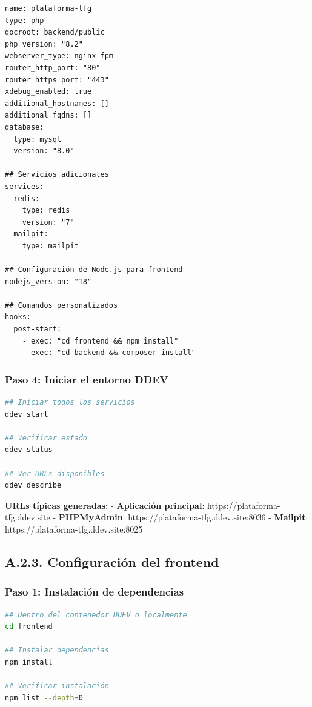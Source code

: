 \documentclass[12pt,a4paper,oneside]{report}
\begin{document}
{\begin{lstlisting}
name: plataforma-tfg
type: php
docroot: backend/public
php_version: "8.2"
webserver_type: nginx-fpm
router_http_port: "80"
router_https_port: "443"
xdebug_enabled: true
additional_hostnames: []
additional_fqdns: []
database:
  type: mysql
  version: "8.0"
  
## Servicios adicionales
services:
  redis:
    type: redis
    version: "7"
  mailpit:
    type: mailpit

## Configuración de Node.js para frontend
nodejs_version: "18"

## Comandos personalizados
hooks:
  post-start:
    - exec: "cd frontend && npm install"
    - exec: "cd backend && composer install"
\end{lstlisting}

\subsubsection{Paso 4: Iniciar el entorno
DDEV}\label{paso-4-iniciar-el-entorno-ddev}

\begin{lstlisting}[language=bash]
## Iniciar todos los servicios
ddev start

## Verificar estado
ddev status

## Ver URLs disponibles
ddev describe
\end{lstlisting}

\textbf{URLs típicas generadas:} - \textbf{Aplicación principal}:
https://plataforma-tfg.ddev.site - \textbf{PHPMyAdmin}:
https://plataforma-tfg.ddev.site:8036 - \textbf{Mailpit}:
https://plataforma-tfg.ddev.site:8025

\subsection{A.2.3. Configuración del
frontend}\label{a.2.3.-configuraciuxf3n-del-frontend}

\subsubsection{Paso 1: Instalación de
dependencias}\label{paso-1-instalaciuxf3n-de-dependencias}

\begin{lstlisting}[language=bash]
## Dentro del contenedor DDEV o localmente
cd frontend

## Instalar dependencias
npm install

## Verificar instalación
npm list --depth=0
\end{lstlisting}

}
\end{document}
